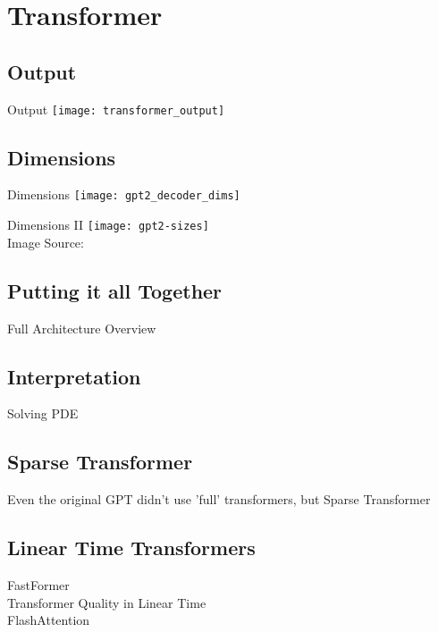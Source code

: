 \section{Transformer}

\subsection{Output}
\begin{frame}[c]{Output}
    \texttt{[image: transformer\_output]}
\end{frame}


\subsection{Dimensions}
\begin{frame}[c]{Dimensions} 
    \texttt{[image: gpt2\_decoder\_dims]}
\end{frame}

\begin{frame}[c]{Dimensions II}
    \texttt{[image: gpt2-sizes]} \\
    Image Source: \cite{alammar_illustrated_2019}
\end{frame}


\subsection{Putting it all Together}
\begin{frame}[c]
    Full Architecture Overview
\end{frame}

\subsection{Interpretation}
\begin{frame}[c]
    Solving PDE \cite{lu_understanding_2019}
\end{frame}

\subsection{Sparse Transformer}
\begin{frame}[c]
    Even the original GPT didn't use 'full' transformers, but Sparse Transformer \cite{child_generating_2019}
\end{frame}

\subsection{Linear Time Transformers}
\begin{frame}[c]
    FastFormer \cite{wu_fastformer_2021} \\
    Transformer Quality in Linear Time \cite{hua_transformer_2022} \\
    FlashAttention \cite{dao_flashattention_2022}
\end{frame}

